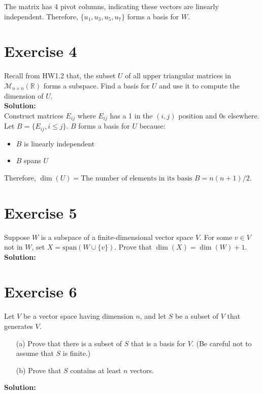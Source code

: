 \documentclass{article}
\begin{document}
The matrix has 4 pivot columns, indicating these vectors are linearly independent. Therefore, $\{u_1, u_3, u_5, u_7\}$ forms a basis for $W$.

\newpage

\section*{Exercise 4}
Recall from HW1.2 that, the subset $U$ of all upper triangular matrices in $\mathcal{M}_{n\times n}(\mathbb{R})$ forms a subspace. Find a basis for $U$ and use it to compute the dimension of $U$. \\

\textbf{Solution:} \\

Construct matrices $E_{ij}$ where $E_{ij}$ has a 1 in the $(i,j)$ position and 0s elsewhere. \\

Let $B = \{E_{ij}, i \leq j\}$. $B$ forms a basis for $U$ because:
\begin{itemize}
\item $B$ is linearly independent
\item $B$ spans $U$
\end{itemize}

Therefore, $\dim(U) = \text{The number of elements in its basis } B = n(n+1)/2$.

\newpage

\section*{Exercise 5}
Suppose $W$ is a subspace of a finite-dimensional vector space $V$. For some $v \in V$ not in $W$, set $X = \text{span}(W \cup \{v\})$. Prove that $\dim(X) = \dim(W) + 1$. \\

\textbf{Solution:} \\

\newpage

\section*{Exercise 6}
Let $V$ be a vector space having dimension $n$, and let $S$ be a subset of $V$ that generates $V$.
\begin{itemize}
\item[(a)] Prove that there is a subset of $S$ that is a basis for $V$. (Be careful not to assume that $S$ is finite.)
\item[(b)] Prove that $S$ contains at least $n$ vectors.
\end{itemize}

\textbf{Solution:} \\
\end{document}
